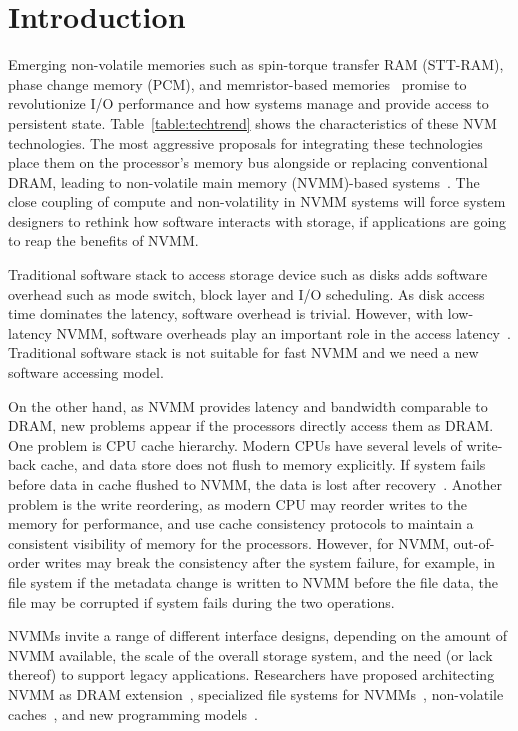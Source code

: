 \section{Introduction}
\label{sec:introduction}

Emerging non-volatile memories such as spin-torque transfer RAM (STT-RAM),
phase change memory (PCM), and
memristor-based memories~\cite{moneta, monetad, quicksan,Onyx,
pollisbetterthaninterrupt}
promise to revolutionize I/O performance and how
systems manage and provide access to persistent state.
Table~\ref{table:techtrend}
shows the characteristics of these NVM technologies. The most aggressive
proposals for integrating these technologies place them on the processor's
memory bus alongside or replacing conventional DRAM, leading to non-volatile
main memory (NVMM)-based systems~\cite{PCM_EfficientMainMemory,
PCMHierarchy,eNVy,WSP,LeeISCA09}. The close coupling of compute and
non-volatility in NVMM systems will force system designers to rethink how
software interacts with storage, if applications are going to reap the benefits of NVMM.

Traditional software stack to access storage device such as disks
adds software overhead such as mode switch, block layer and I/O scheduling.
As disk access time dominates the latency, software overhead is trivial.
However, with low-latency NVMM, software overheads play an important role
in the access latency~\cite{monetad,BankShot}. Traditional software
stack is not suitable for fast NVMM and we need a new software accessing model.

On the other hand, as NVMM provides latency and bandwidth comparable to DRAM,
new problems
appear if the processors directly access them as DRAM. One problem is 
CPU cache hierarchy. Modern CPUs have several levels of write-back cache,
 and data store does not flush to memory explicitly. If system fails before
data in cache flushed to NVMM, the data is lost after
recovery~\cite{CPUcaching}. Another
problem is the write reordering, as modern CPU may reorder writes to the
memory for performance, and use cache consistency protocols to maintain
a consistent visibility of memory for the processors. However, for NVMM,
out-of-order writes may break the consistency after the system failure,
for example, in file system if the metadata change is written to NVMM before
the file data, the file may be corrupted if system fails during the two 
operations. 

NVMMs invite a range of different interface designs, depending on the amount of
NVMM available, the scale of the overall storage system, and the need (or lack
thereof) to support legacy applications.  Researchers have proposed architecting
NVMM as DRAM extension~\cite{pdram, memorage, duet}, specialized
file systems for NVMMs~\cite{PMFS,BPFS}, non-volatile
caches~\cite{RVM,riofilecache,riovista}, and new programming
models~\cite{nvheaps,mnemosyne}.

